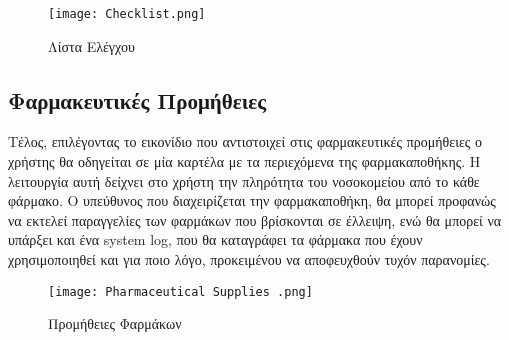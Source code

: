 \documentclass{article}
\begin{document}
\vspace{0.3cm}

\begin{figure}[!htb]
\centering
\texttt{[image: Checklist.png]}
\caption{\label{fig:checklist} Λίστα Ελέγχου}
\end{figure}

\newpage

\subsection{Φαρμακευτικές Προμήθειες}

Τέλος, επιλέγοντας το εικονίδιο που αντιστοιχεί στις φαρμακευτικές προμήθειες ο χρήστης θα οδηγείται σε μία καρτέλα με τα περιεχόμενα της φαρμακαποθήκης. Η λειτουργία αυτή δείχνει στο χρήστη την πληρότητα του νοσοκομείου από το κάθε φάρμακο. Ο υπεύθυνος που διαχειρίζεται την φαρμακαποθήκη, θα μπορεί προφανώς να εκτελεί παραγγελίες των φαρμάκων που βρίσκονται σε έλλειψη, ενώ θα μπορεί να υπάρξει και ένα system log, που θα καταγράφει τα φάρμακα που έχουν χρησιμοποιηθεί και για ποιο λόγο, προκειμένου να αποφευχθούν τυχόν παρανομίες.

\vspace{0.3cm}

\begin{figure}[!htb]
\centering
\texttt{[image: Pharmaceutical Supplies .png]}
\caption{\label{fig:Medical Supplies} Προμήθειες Φαρμάκων}
\end{figure}
\end{document}
